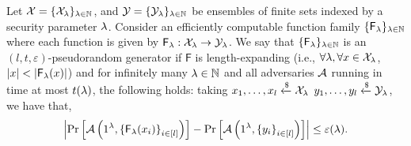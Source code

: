 \begin{definition}
Let $\mathcal{X} = \{\mathcal{X}_\lambda\}_{\lambda \in \mathbb{N}}$, and $\mathcal{Y} = \{\mathcal{Y}_\lambda\}_{\lambda \in \mathbb{N}}$ be ensembles of finite sets indexed by a security parameter $\lambda$. Consider an efficiently computable function family $\{\mathsf{F}_\lambda\}_{\lambda \in \mathbb{N}}$ where each function is given by $\mathsf{F}_\lambda: \mathcal{X}_\lambda \to \mathcal{Y}_\lambda$.
We say that $\{\mathsf{F}_\lambda\}_{\lambda \in \mathbb{N}}$ is an $(l,t, \varepsilon)$-pseudorandom generator if $\mathsf{F}$ is length-expanding (i.e., $\forall \lambda, \forall x \in \mathcal{X}_\lambda$, $\left| {x} \right| < \left| {\mathsf{F}_\lambda(x)} \right|$) and for infinitely many $\lambda \in \mathbb{N}$ and all adversaries $\mathcal{A}$ running in time at most $t(\lambda)$, the following holds: taking $x_1, \dots, x_l \xleftarrow{\$} \mathcal{X}_\lambda$  $y_1, \dots, y_l \xleftarrow{\$} \mathcal{Y}_\lambda$, we have that,
\[
    \left|\Pr\left[ \mathcal{A}\left(1^\lambda, {\{\mathsf{F}_\lambda(x_i)\}}_{i \in [l]} \right)\right]
    - \Pr\left[ \mathcal{A}\left(1^\lambda, {\{y_i\}}_{i \in [l]}\right)\right] \right| \leq \varepsilon(\lambda).
\]
\end{definition}
